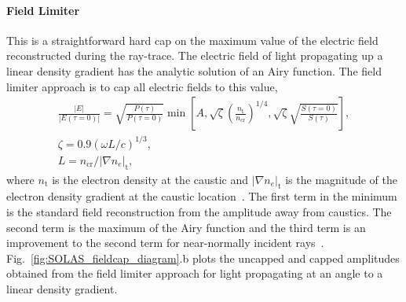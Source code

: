 \paragraph*{Field Limiter}
This is a straightforward hard cap on the maximum value of the electric field reconstructed during the ray-trace.
The electric field of light propagating up a linear density gradient has the analytic solution of an Airy function.
The field limiter approach is to cap all electric fields to this value,
\begin{equation}
    \begin{gathered}
        \frac{|E|}{|E(\tau=0)|} = \sqrt{\frac{P(\tau)}{P(\tau=0)}} \min\left[ A, \sqrt{\zeta}\left( \frac{n_{\text{t}}}{n_{\text{cr}}} \right)^{1/4}, \sqrt{\zeta}\sqrt{\frac{S(\tau=0)}{S(\tau)}} \right], \\
        \zeta = 0.9\left( \omega L/c \right)^{1/3}, \\
        L = n_{\text{cr}}/|\nabla n_e|_\text{t},
    \end{gathered}
\end{equation}
where $n_{\text{t}}$ is the electron density at the caustic and $|\nabla n_e|_\text{t}$ is the magnitude of the electron density gradient at the caustic location~\cite{igumenshchev_crossed-beam_2012,follett_ray-based_2018,kruer_physics_2003}.
The first term in the minimum is the standard field reconstruction from the amplitude away from caustics.
The second term is the maximum of the Airy function and the third term is an improvement to the second term for near-normally incident rays~\cite{follett_validation_2022}.
Fig.~\ref{fig:SOLAS_fieldcap_diagram}.b plots the uncapped and capped amplitudes obtained from the field limiter approach for light propagating at an angle to a linear density gradient.


